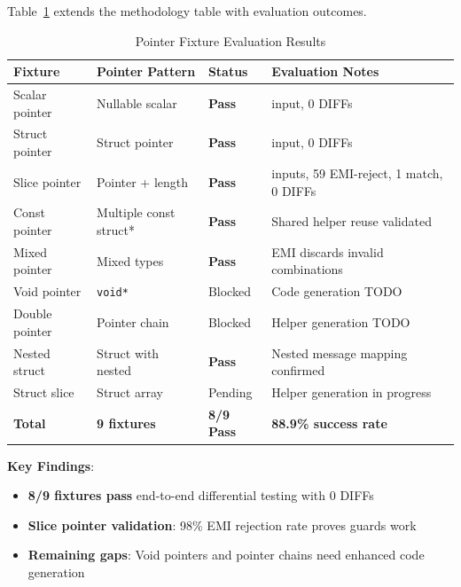\documentclass[doublespace,nopageskip]{VTthesis}
\begin{document}
Table~\ref{tab:pointer_fixtures_results} extends the methodology table with evaluation outcomes.

\begin{table}[htb]
    \centering
    \caption{Pointer Fixture Evaluation Results}
    \begin{tabularx}{\textwidth}{>{\raggedright\arraybackslash}p{3.2cm} >{\raggedright\arraybackslash}p{2.8cm} >{\centering\arraybackslash}p{1.8cm} >{\raggedright\arraybackslash}X}
        \toprule
        Fixture & Pointer Pattern & Status & Evaluation Notes \\
        \midrule
        Scalar pointer & Nullable scalar & \textbf{Pass} & 1 input, 0 DIFFs \\
        Struct pointer & Struct pointer & \textbf{Pass} & 1 input, 0 DIFFs \\
        Slice pointer & Pointer + length & \textbf{Pass} & 60 inputs, 59 EMI-reject, 1 match, 0 DIFFs \\
        Const pointer & Multiple const struct* & \textbf{Pass} & Shared helper reuse validated \\
        Mixed pointer & Mixed types & \textbf{Pass} & EMI discards invalid combinations \\
        Void pointer & \texttt{void*} & Blocked & Code generation TODO \\
        Double pointer & Pointer chain & Blocked & Helper generation TODO \\
        Nested struct & Struct with nested & \textbf{Pass} & Nested message mapping confirmed \\
        Struct slice & Struct array & Pending & Helper generation in progress \\
        \midrule
        \textbf{Total} & \textbf{9 fixtures} & \textbf{8/9 Pass} & \textbf{88.9\% success rate} \\
        \bottomrule
    \end{tabularx}
    \label{tab:pointer_fixtures_results}
\end{table}

\textbf{Key Findings}:
\begin{itemize}
    \item \textbf{8/9 fixtures pass} end-to-end differential testing with 0 DIFFs
    \item \textbf{Slice pointer validation}: 98\% EMI rejection rate proves guards work
    \item \textbf{Remaining gaps}: Void pointers and pointer chains need enhanced code generation
\end{itemize}
\end{document}
